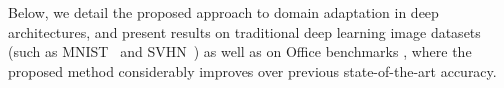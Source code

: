 
Below, we detail the proposed approach to domain adaptation in deep architectures, and present results on traditional deep learning image datasets (such as MNIST~\cite{LeCun98} and SVHN~\cite{Netzer11}) as well as on {\sc Office} benchmarks \cite{Saenko10}, where the proposed method considerably improves over previous state-of-the-art accuracy.




